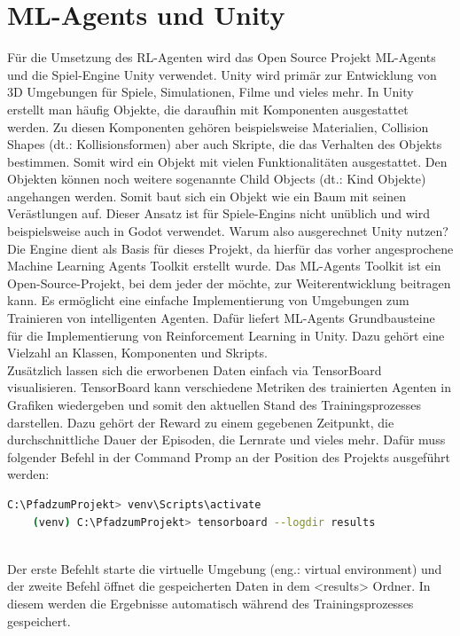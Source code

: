 \newpage
\section{ML-Agents und Unity}
\label{mlagents}
Für die Umsetzung des RL-Agenten wird das Open Source Projekt ML-Agents und die Spiel-Engine Unity verwendet. Unity wird primär zur Entwicklung von 3D Umgebungen für Spiele, Simulationen, Filme und vieles mehr.\cite{unity} In Unity erstellt man häufig Objekte, die daraufhin mit Komponenten ausgestattet werden. Zu diesen Komponenten gehören beispielsweise Materialien, Collision Shapes (dt.: Kollisionsformen) aber auch Skripte, die das Verhalten des Objekts bestimmen. Somit wird ein Objekt mit vielen Funktionalitäten ausgestattet. Den Objekten können noch weitere sogenannte Child Objects (dt.: Kind Objekte) angehangen werden. Somit baut sich ein Objekt wie ein Baum mit seinen Verästlungen auf. Dieser Ansatz ist für Spiele-Engins nicht unüblich und wird beispielsweise auch in Godot verwendet. Warum also ausgerechnet Unity nutzen? 
\\
Die Engine dient als Basis für dieses Projekt, da hierfür das vorher angesprochene Machine Learning Agents Toolkit erstellt wurde. Das ML-Agents Toolkit ist ein Open-Source-Projekt, bei dem jeder der möchte, zur Weiterentwicklung beitragen kann. Es ermöglicht eine einfache Implementierung von Umgebungen zum Trainieren von intelligenten Agenten.\cite{ml_agents} Dafür liefert ML-Agents Grundbausteine für die Implementierung von Reinforcement Learning in Unity. Dazu gehört eine Vielzahl an Klassen, Komponenten und Skripts. 
\\
Zusätzlich lassen sich die erworbenen Daten einfach via TensorBoard visualisieren.\cite{tensorboard} TensorBoard kann verschiedene Metriken des trainierten Agenten in Grafiken wiedergeben und somit den aktuellen Stand des Trainingsprozesses darstellen. Dazu gehört der Reward zu einem gegebenen Zeitpunkt, die durchschnittliche Dauer der Episoden, die Lernrate und vieles mehr. Dafür muss folgender Befehl in der Command Promp an der Position des Projekts ausgeführt werden: 
\\
\begin{lstlisting}[language=bash,numbers=none]
	C:\PfadzumProjekt> venv\Scripts\activate
	(venv) C:\PfadzumProjekt> tensorboard --logdir results
\end{lstlisting}
\noindent
\\
Der erste Befehlt starte die virtuelle Umgebung (eng.: virtual environment) und der zweite Befehl öffnet die gespeicherten Daten in dem <results> Ordner. In diesem werden die Ergebnisse automatisch während des Trainingsprozesses gespeichert.
